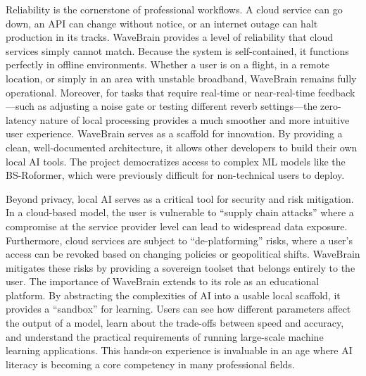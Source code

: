 \documentclass[12pt,a4paper]{article}
\begin{document}
Reliability is the cornerstone of professional workflows. A cloud service can go down, an API can change without notice, or an internet outage can halt production in its tracks. WaveBrain provides a level of reliability that cloud services simply cannot match. Because the system is self-contained, it functions perfectly in offline environments. Whether a user is on a flight, in a remote location, or simply in an area with unstable broadband, WaveBrain remains fully operational. Moreover, for tasks that require real-time or near-real-time feedback---such as adjusting a noise gate or testing different reverb settings---the zero-latency nature of local processing provides a much smoother and more intuitive user experience. WaveBrain serves as a scaffold for innovation. By providing a clean, well-documented architecture, it allows other developers to build their own local AI tools. The project democratizes access to complex ML models like the BS-Roformer, which were previously difficult for non-technical users to deploy.

Beyond privacy, local AI serves as a critical tool for security and risk mitigation. In a cloud-based model, the user is vulnerable to ``supply chain attacks'' where a compromise at the service provider level can lead to widespread data exposure. Furthermore, cloud services are subject to ``de-platforming'' risks, where a user's access can be revoked based on changing policies or geopolitical shifts. WaveBrain mitigates these risks by providing a sovereign toolset that belongs entirely to the user. The importance of WaveBrain extends to its role as an educational platform. By abstracting the complexities of AI into a usable local scaffold, it provides a ``sandbox'' for learning. Users can see how different parameters affect the output of a model, learn about the trade-offs between speed and accuracy, and understand the practical requirements of running large-scale machine learning applications. This hands-on experience is invaluable in an age where AI literacy is becoming a core competency in many professional fields.

\newpage
\end{document}

